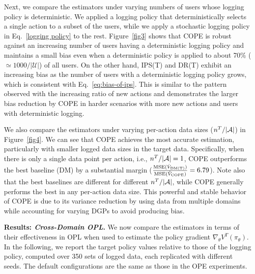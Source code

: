 \documentclass{article} %
\theoremstyle{definition}
\begin{document}
Next, we compare the estimators under varying numbers of users whose logging policy is deterministic. We applied a logging policy that deterministically selects a single action to a subset of the users, while we apply a stochastic logging policy in Eq.~\eqref{logging policy} to the rest. Figure~\ref{fig3} shows that COPE is robust against an increasing number of users having a deterministic logging policy and maintains a small bias even when a deterministic policy is applied to about 70\% ($\simeq1000/|\mathcal{U}|$) of all users. On the other hand, IPS(T) and DR(T) exhibit an increasing bias as the number of users with a deterministic logging policy grows, which is consistent with Eq.~\eqref{eq:bias-of-ips}. This is similar to the pattern observed with the increasing ratio of new actions and demonstrates the larger bias reduction by COPE in harder scenarios with more new actions and users with deterministic logging.

We also compare the estimators under varying per-action data sizes ($n^T / |\mathcal{A}|$) in Figure~\ref{fig4}. We can see that COPE achieves the most accurate estimation, particularly with smaller logged data sizes in the target data. Specifically, when there is only a single data point per action, i.e., $n^T / |\mathcal{A}| = 1$, COPE outperforms the best baseline (DM) by a substantial margin ($\frac{\mathrm{MSE}(\hat{V}_{\rm{DM(T)}})}{\mathrm{MSE}(\hat{V}_{\rm{COPE}})}=6.79$). Note also that the best baselines are different for different $n^T / |\mathcal{A}|$, while COPE generally performs the best in any per-action data size. This powerful and stable behavior of COPE is due to its variance reduction by using data from multiple domains while accounting for varying DGPs to avoid producing bias.


\textbf{Results: \textit{Cross-Domain OPL}.}
We now compare the estimators in terms of their effectiveness in OPL when used to estimate the policy gradient $\nabla_{\theta}V^T(\pi_{\theta})$. In the following, we report the target policy values relative to those of the logging policy, computed over 350 sets of logged data, each replicated with different seeds. The default configurations are the same as those in the OPE experiments.
\end{document}
